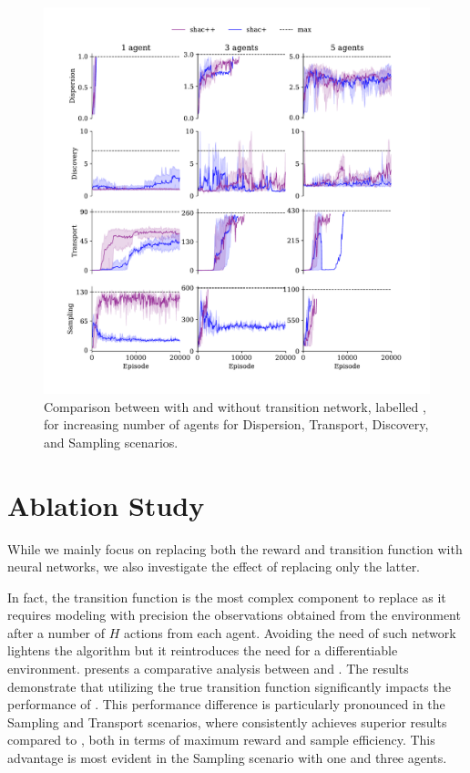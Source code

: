 \begin{figure}[!t]
    \centering
    \includegraphics[width=\textwidth]{figs/ablation-transformer.pdf}
    \caption{Comparison between \fname{} with and without transition network, labelled \fnamer{}, for increasing number of agents for Dispersion, Transport, Discovery, and Sampling scenarios.}
    \label{fig:ablation}
\end{figure}




\section{Ablation Study}\label{sect:ablation}
While we mainly focus on replacing both the reward and transition function with neural networks, we also investigate the effect of replacing only the latter. 

In fact, the transition function is the most complex component to replace as it requires modeling with precision the observations obtained from the environment after a number of $H$ actions from each agent. Avoiding the need of such network lightens the algorithm but it reintroduces the need for a differentiable environment.
 presents a comparative analysis between \fname{} and \fnamer{}. The results demonstrate that utilizing the true transition function significantly impacts the performance of \fname{}. This performance difference is particularly pronounced in the Sampling and Transport scenarios, where \fname{} consistently achieves superior results compared to \fnamer{}, both in terms of maximum reward and sample efficiency. This advantage is most evident in the Sampling scenario with one and three agents.

